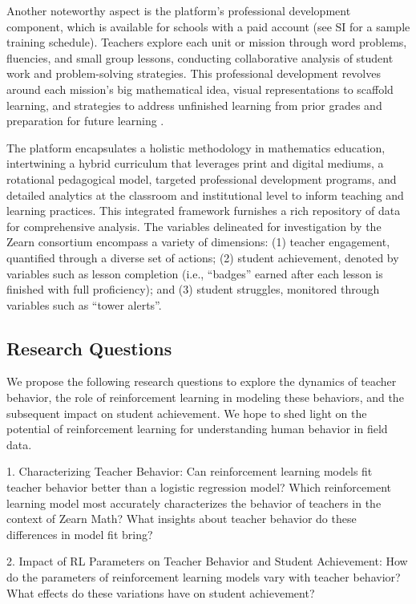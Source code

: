 \documentclass[
  number,
  preprint,
  3p,
  onecolumn]{elsarticle}
\begin{document}
Another noteworthy aspect is the platform's professional development
component, which is available for schools with a paid account (see SI
for a sample training schedule). Teachers explore each unit or mission
through word problems, fluencies, and small group lessons, conducting
collaborative analysis of student work and problem-solving strategies.
This professional development revolves around each mission's big
mathematical idea, visual representations to scaffold learning, and
strategies to address unfinished learning from prior grades and
preparation for future learning \citep{morrison2019}.

The platform encapsulates a holistic methodology in mathematics
education, intertwining a hybrid curriculum that leverages print and
digital mediums, a rotational pedagogical model, targeted professional
development programs, and detailed analytics at the classroom and
institutional level to inform teaching and learning practices. This
integrated framework furnishes a rich repository of data for
comprehensive analysis. The variables delineated for investigation by
the Zearn consortium encompass a variety of dimensions: (1) teacher
engagement, quantified through a diverse set of actions; (2) student
achievement, denoted by variables such as lesson completion (i.e.,
``badges'' earned after each lesson is finished with full proficiency);
and (3) student struggles, monitored through variables such as ``tower
alerts''.

\subsection{Research Questions}\label{research-questions}

We propose the following research questions to explore the dynamics of
teacher behavior, the role of reinforcement learning in modeling these
behaviors, and the subsequent impact on student achievement. We hope to
shed light on the potential of reinforcement learning for understanding
human behavior in field data.

1. Characterizing Teacher Behavior: Can reinforcement learning models
fit teacher behavior better than a logistic regression model? Which
reinforcement learning model most accurately characterizes the behavior
of teachers in the context of Zearn Math? What insights about teacher
behavior do these differences in model fit bring?

2. Impact of RL Parameters on Teacher Behavior and Student Achievement:
How do the parameters of reinforcement learning models vary with teacher
behavior? What effects do these variations have on student achievement?
\end{document}
